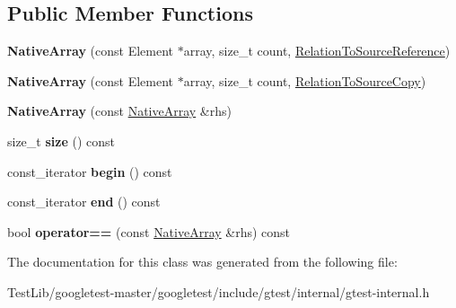 \subsection*{Public Member Functions}
\begin{DoxyCompactItemize}
\item 
\mbox{\label{classtesting_1_1internal_1_1NativeArray_a52b3689c62532703d11e9d82939a7141}} 
{\bfseries Native\+Array} (const Element $\ast$array, size\+\_\+t count, \hyperlink{structtesting_1_1internal_1_1RelationToSourceReference}{Relation\+To\+Source\+Reference})
\item 
\mbox{\label{classtesting_1_1internal_1_1NativeArray_ac184ee5741af5be3402213819c834405}} 
{\bfseries Native\+Array} (const Element $\ast$array, size\+\_\+t count, \hyperlink{structtesting_1_1internal_1_1RelationToSourceCopy}{Relation\+To\+Source\+Copy})
\item 
\mbox{\label{classtesting_1_1internal_1_1NativeArray_abb346ac3040f5da733f594cc2d5958bc}} 
{\bfseries Native\+Array} (const \hyperlink{classtesting_1_1internal_1_1NativeArray}{Native\+Array} \&rhs)
\item 
\mbox{\label{classtesting_1_1internal_1_1NativeArray_af96a4a5ca0cdd5d163c47a081f08bd89}} 
size\+\_\+t {\bfseries size} () const
\item 
\mbox{\label{classtesting_1_1internal_1_1NativeArray_a3046d93cfa23097e7b7c91f5f982dc78}} 
const\+\_\+iterator {\bfseries begin} () const
\item 
\mbox{\label{classtesting_1_1internal_1_1NativeArray_ae1cda748e49c6906421c6183c4d07c5a}} 
const\+\_\+iterator {\bfseries end} () const
\item 
\mbox{\label{classtesting_1_1internal_1_1NativeArray_a81b90f5739ed812610e68dc34c9e3850}} 
bool {\bfseries operator==} (const \hyperlink{classtesting_1_1internal_1_1NativeArray}{Native\+Array} \&rhs) const
\end{DoxyCompactItemize}


The documentation for this class was generated from the following file\+:\begin{DoxyCompactItemize}
\item 
Test\+Lib/googletest-\/master/googletest/include/gtest/internal/gtest-\/internal.\+h\end{DoxyCompactItemize}
